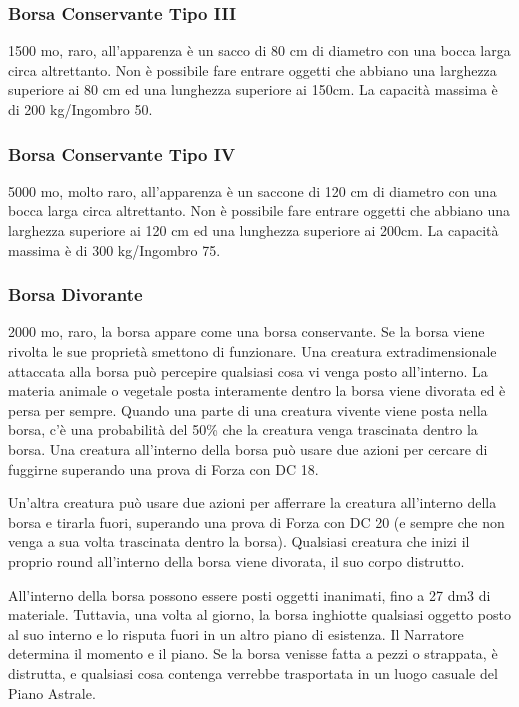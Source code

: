 \begin{multicols}{2}
\subsubsection*{Borsa Conservante Tipo III}
1500 mo, raro, all'apparenza è un sacco di 80 cm di diametro con una bocca larga circa altrettanto.
Non è possibile fare entrare oggetti che abbiano una larghezza superiore ai 80 cm ed una lunghezza superiore ai 150cm. La capacità massima è di 200 kg/Ingombro 50.

\subsubsection*{Borsa Conservante Tipo IV}
5000 mo, molto raro, all'apparenza è un saccone di 120 cm di diametro con una bocca larga circa altrettanto.
Non è possibile fare entrare oggetti che abbiano una larghezza superiore ai 120 cm ed una lunghezza superiore ai 200cm. La capacità massima è di 300 kg/Ingombro 75.

\subsubsection*{Borsa Divorante}
2000 mo, raro, la borsa appare come una borsa conservante. Se la borsa viene rivolta le sue proprietà smettono di funzionare. Una creatura extradimensionale attaccata alla borsa può percepire qualsiasi cosa vi venga posto all'interno. La materia animale o vegetale posta interamente dentro la borsa viene divorata ed è persa per sempre. Quando una parte di una creatura vivente viene posta nella borsa, c'è una probabilità del 50\% che la creatura venga trascinata dentro la borsa. Una creatura all'interno della borsa può usare due azioni per cercare di fuggirne superando una prova di Forza con DC 18.

Un'altra creatura può usare due azioni per afferrare la creatura all'interno della borsa e tirarla fuori, superando una prova di Forza con DC 20 (e sempre che non venga a sua volta trascinata dentro la borsa). Qualsiasi creatura che inizi il proprio round all'interno della borsa viene divorata, il suo corpo distrutto.

All'interno della borsa possono essere posti oggetti inanimati, fino a 27 dm3 di materiale. Tuttavia, una volta al giorno, la borsa inghiotte qualsiasi oggetto posto al suo interno e lo risputa fuori in un altro piano di esistenza. Il Narratore determina il momento e il piano. Se la borsa venisse fatta a pezzi o strappata, è distrutta, e qualsiasi cosa contenga verrebbe trasportata in un luogo casuale del Piano Astrale.


\end{multicols}

